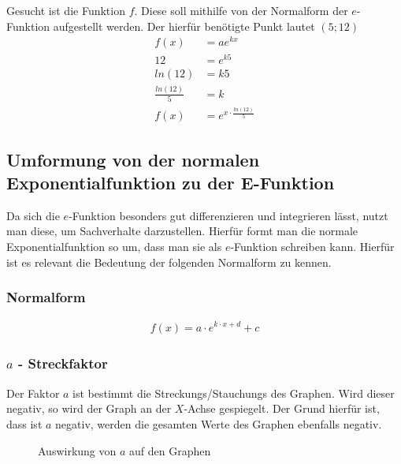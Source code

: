 \begin{beispiel}
\begin{beispiel}
	Gesucht ist die Funktion $f$. Diese soll mithilfe von der Normalform der $e$-Funktion aufgestellt werden. Der hierfür benötigte Punkt lautet $(5;12)$
	\begin{align*}
		f(x)&=ae^{kx}\\
		12&=e^{k5}\tag{Anwenden des ln}\\
		ln(12)&=k5\tag{Dividieren mit 5}\\
		\frac{ln(12)}{5}&=k\\
		f(x)&=e^{x\cdot \frac{ln(12)}{5}}
	\end{align*}
\end{beispiel}
\pagebreak
\subsection{Umformung von der normalen Exponentialfunktion zu der E-Funktion}\label{sec:E-Funktion/Umformung von der normalen Exponentialfunktion zu der E-Funktion}
Da sich die $e$-Funktion besonders gut differenzieren und integrieren lässt, nutzt man diese, um Sachverhalte darzustellen. Hierfür formt man die normale Exponentialfunktion so um, dass man sie als $e$-Funktion schreiben kann. Hierfür ist es relevant die Bedeutung der folgenden Normalform zu kennen. 
\subsubsection{Normalform}\label{sec:E-Funktion/Umformung von der normalen Exponentialfunktion zu der E-Funktion/Normalform}
\begin{align*}
	f(x)=a\cdot e^{k\cdot x+d}+c
\end{align*}
\pagebreak
\subsubsection{$a$ - Streckfaktor}\label{sec:E-Funktion/Umformung von der normalen Exponentialfunktion zu der E-Funktion/Normalform/a - Streckfaktor}
Der Faktor $a$ ist bestimmt die Streckungs/Stauchungs des Graphen. Wird dieser negativ, so wird der Graph an der $X$-Achse gespiegelt. Der Grund hierfür ist, dass ist $a$ negativ, werden die gesamten Werte des Graphen ebenfalls negativ. 
\begin{figure}[h]
\centering
	\caption{Auswirkung von $a$ auf den Graphen}
\end{figure}
\pagebreak

\end{beispiel}
